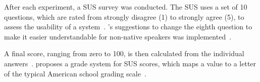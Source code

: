 After each experiment, a \ac{SUS} survey was conducted. The \acf{SUS} uses a set of 10 questions, which are rated from strongly disagree (1) to strongly agree (5), to assess the usability of a system~\cite[3]{Brooke.1996}. \citeauthor{Finstad.2006}'s suggestions to change the eighth question to make it easier understandable for non-native speakers was implemented~\cite[188]{Finstad.2006}. 

A final score, ranging from zero to 100, is then calculated from the individual answers~\cite{Brooke.1996}. \citeauthor{Bangor.2009} proposes a grade system for \ac{SUS} scores, which maps a value to a letter of the typical American school grading scale~\cite{Bangor.2009}.